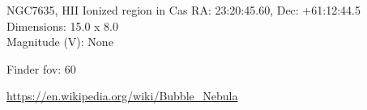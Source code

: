 \begin{block}{NGC7635, HII Ionized region in Cas}
    RA: 23:20:45.60, Dec: +61:12:44.5 \\ 
    Dimensions: 15.0 x 8.0 \\ 
    Magnitude (V): None



    Finder fov: 60 

    \url{https://en.wikipedia.org/wiki/Bubble_Nebula} 
\end{block}